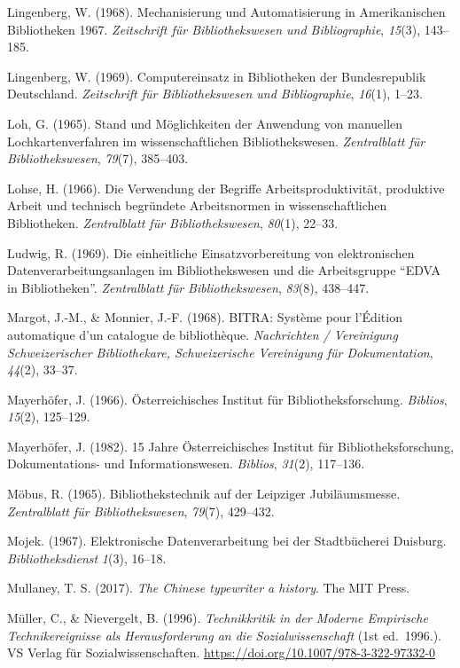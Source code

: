 \documentclass[a4paper,
fontsize=11pt,
oneside,
numbers=noperiodatend,
parskip=half-,
bibliography=totoc,
final
]{scrartcl}
\begin{document}
Lingenberg, W. (1968). Mechanisierung und Automatisierung in
Amerikanischen Bibliotheken 1967. \emph{Zeitschrift für Bibliothekswesen
und Bibliographie}, \emph{15}(3), 143--185.

Lingenberg, W. (1969). Computereinsatz in Bibliotheken der
Bundesrepublik Deutschland. \emph{Zeitschrift für Bibliothekswesen und
Bibliographie}, \emph{16}(1), 1--23.

Loh, G. (1965). Stand und Möglichkeiten der Anwendung von manuellen
Lochkartenverfahren im wissenschaftlichen Bibliothekswesen.
\emph{Zentralblatt für Bibliothekswesen}, \emph{79}(7), 385--403.

Lohse, H. (1966). Die Verwendung der Begriffe Arbeitsproduktivität,
produktive Arbeit und technisch begründete Arbeitsnormen in
wissenschaftlichen Bibliotheken. \emph{Zentralblatt für
Bibliothekswesen}, \emph{80}(1), 22--33.

Ludwig, R. (1969). Die einheitliche Einsatzvorbereitung von
elektronischen Datenverarbeitungsanlagen im Bibliothekswesen und die
Arbeitsgruppe \enquote{EDVA in Bibliotheken}. \emph{Zentralblatt für
Bibliothekswesen}, \emph{83}(8), 438--447.

Margot, J.-M., \& Monnier, J.-F. (1968). BITRA: Système pour l'Édition
automatique d'un catalogue de bibliothèque. \emph{Nachrichten /
Vereinigung Schweizerischer Bibliothekare, Schweizerische Vereinigung
für Dokumentation}, \emph{44}(2), 33--37.

Mayerhöfer, J. (1966). Österreichisches Institut für
Bibliotheksforschung. \emph{Biblios}, \emph{15}(2), 125--129.

Mayerhöfer, J. (1982). 15 Jahre Österreichisches Institut für
Bibliotheksforschung, Dokumentations- und Informationswesen.
\emph{Biblios}, \emph{31}(2), 117--136.

Möbus, R. (1965). Bibliothekstechnik auf der Leipziger Jubiläumsmesse.
\emph{Zentralblatt für Bibliothekswesen}, \emph{79}(7), 429--432.

Mojek. (1967). Elektronische Datenverarbeitung bei der Stadtbücherei
Duisburg. \emph{Bibliotheksdienst} \emph{1}(3), 16--18.

Mullaney, T. S. (2017). \emph{The Chinese typewriter a history}. The MIT
Press.

Müller, C., \& Nievergelt, B. (1996). \emph{Technikkritik in der Moderne
Empirische Technikereignisse als Herausforderung an die
Sozialwissenschaft} (1st ed.~1996.). VS Verlag für Sozialwissenschaften.
\url{https://doi.org/10.1007/978-3-322-97332-0}
\end{document}

